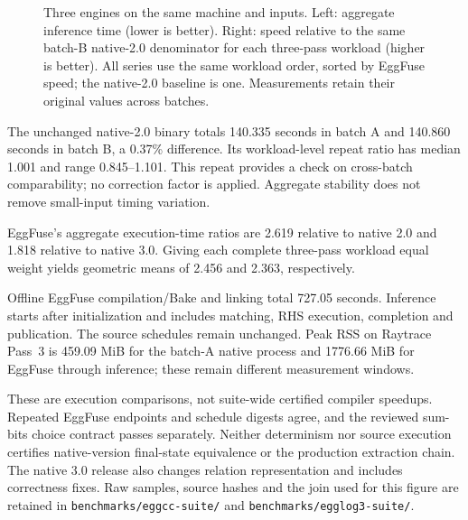 \begin{figure}[ht]\centering

\caption{Three engines on the same machine and inputs. Left: aggregate inference time (lower is better). Right: speed relative to the same batch-B native-2.0 denominator for each three-pass workload (higher is better). All series use the same workload order, sorted by EggFuse speed; the native-2.0 baseline is one. Measurements retain their original values across batches.}\label{fig:current-dist}\end{figure}

The unchanged native-2.0 binary totals 140.335 seconds in batch A and 140.860 seconds in batch B, a 0.37\% difference. Its workload-level repeat ratio has median 1.001 and range 0.845--1.101. This repeat provides a check on cross-batch comparability; no correction factor is applied. Aggregate stability does not remove small-input timing variation.

EggFuse's aggregate execution-time ratios are 2.619 relative to native 2.0 and 1.818 relative to native 3.0. Giving each complete three-pass workload equal weight yields geometric means of 2.456 and 2.363, respectively.

Offline EggFuse compilation/Bake and linking total 727.05 seconds. Inference starts after initialization and includes matching, RHS execution, completion and publication. The source schedules remain unchanged. Peak RSS on Raytrace Pass~3 is 459.09 MiB for the batch-A native process and 1776.66 MiB for EggFuse through inference; these remain different measurement windows.

These are execution comparisons, not suite-wide certified compiler speedups. Repeated EggFuse endpoints and schedule digests agree, and the reviewed sum-bits choice contract passes separately. Neither determinism nor source execution certifies native-version final-state equivalence or the production extraction chain. The native 3.0 release also changes relation representation and includes correctness fixes. Raw samples, source hashes and the join used for this figure are retained in \texttt{benchmarks/eggcc-suite/} and \texttt{benchmarks/egglog3-suite/}.
